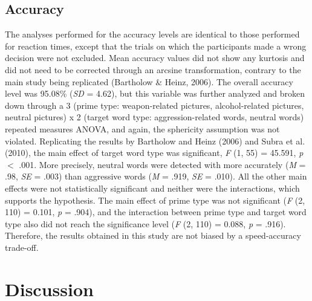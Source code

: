\documentclass[authordate, serif, review]{jote-article}
\begin{document}
\begin{multicols}{2}
\subsection*{Accuracy}
The analyses performed for the accuracy levels are identical to those performed for reaction times, except that the trials on which the participants made a wrong decision were not excluded. Mean accuracy values did not show any kurtosis and did not need to be corrected through an arcsine transformation, contrary to the main study being replicated (Bartholow \& Heinz, 2006). The overall accuracy level was 95.08\% (\textit{SD }= 4.62), but this variable was further analyzed and broken down through a 3 (prime type: weapon-related pictures, alcohol-related pictures, neutral pictures) x 2 (target word type: aggression-related words, neutral words) repeated measures ANOVA, and again, the sphericity assumption was not violated. Replicating the results by Bartholow and Heinz (2006) and Subra et al. (2010), the main effect of target word type was significant, \textit{F }(1, 55) = 45.591, \textit{p }$\mathrm{<}$ .001. More precisely, neutral words were detected with more accurately (\textit{M }= .98, \textit{SE }= .003) than aggressive words (\textit{M }= .919, \textit{SE }= .010). All the other main effects were not statistically significant and neither were the interactions, which supports the hypothesis. The main effect of prime type was not significant (\textit{F} (2, 110) = 0.101, \textit{p }= .904), and the interaction between prime type and target word type also did not reach the significance level (\textit{F }(2, 110) = 0.088, \textit{p }= .916). Therefore, the results obtained in this study are not biased by a speed-accuracy trade-off.  

{}
\section*{Discussion} \gotoreview
\label{sec:discussion}


\end{multicols}
\end{document}
